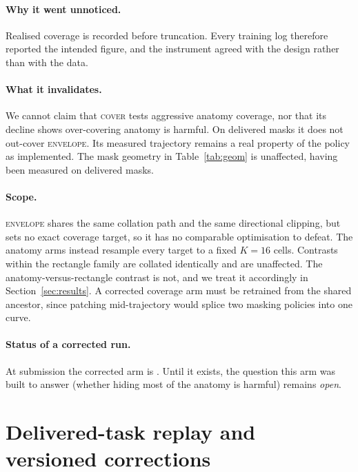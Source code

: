 \documentclass{article}
\begin{document}
\paragraph{Why it went unnoticed.} Realised coverage is recorded before
truncation. Every training log therefore reported the intended figure, and the
instrument agreed with the design rather than with the data.

\paragraph{What it invalidates.} We cannot claim that \textsc{cover} tests
aggressive anatomy coverage, nor that its decline shows over-covering anatomy is
harmful. On delivered masks it does not out-cover \textsc{envelope}. Its measured
trajectory remains a real property of the policy as implemented. The mask
geometry in Table~\ref{tab:geom} is unaffected, having been measured on delivered
masks.

\paragraph{Scope.} \textsc{envelope} shares the same collation path and the same
directional clipping, but sets no exact coverage target, so it has no comparable
optimisation to defeat. The anatomy arms instead resample every target to a fixed
$K{=}16$ cells. Contrasts within the rectangle family are collated identically
and are unaffected. The anatomy-versus-rectangle contrast is not, and we treat it
accordingly in Section~\ref{sec:results}. A corrected coverage arm must be
retrained from the shared ancestor, since patching mid-trajectory would splice
two masking policies into one curve.

\paragraph{Status of a corrected run.} At submission the corrected arm is
\CoverFixedStatus{}. Until it exists, the question this arm was built to answer
(whether hiding most of the anatomy is harmful) remains \emph{open}.

\section{Delivered-task replay and versioned corrections}
\label{app:delivered_audit}
\end{document}
